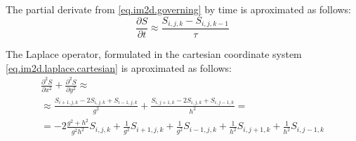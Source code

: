 \documentclass[a4paper,10pt]{article}
\begin{document}
The partial derivate from \eqref{eq.im2d.governing} by time is aproximated as follows:
\begin{equation}\label{eq.im2d.time}
    \frac{\partial S}{\partial t}
    \approx
    \frac{S_{i,j,k} - S_{i,j,k-1}}{\tau}
\end{equation}


The Laplace operator, formulated in the cartesian coordinate system \eqref{eq.im2d.laplace.cartesian}
is aproximated as follows:
\begin{multline}\label{eq.im2d.diffusion.cartesian}
    \frac{\partial^2 S}{\partial x^2} + \frac{\partial^2 S}{\partial y^2}
    \approx
    \\%
    \approx
    \frac{S_{i+1,j,k} - 2 S_{i,j,k} + S_{i-1,j,k}}{g^2} +
    \frac{S_{i,j+1,k} - 2 S_{i,j,k} + S_{i,j-1,k}}{h^2}
    =
    \\%
    =
    -2\frac{g^2 + h^2}{g^2 h^2} S_{i,j,k}
    +\frac{1}{g^2}              S_{i+1,j,k}
    +\frac{1}{g^2}              S_{i-1,j,k}
    +\frac{1}{h^2}              S_{i,j+1,k}
    +\frac{1}{h^2}              S_{i,j-1,k}
\end{multline}
\end{document}
